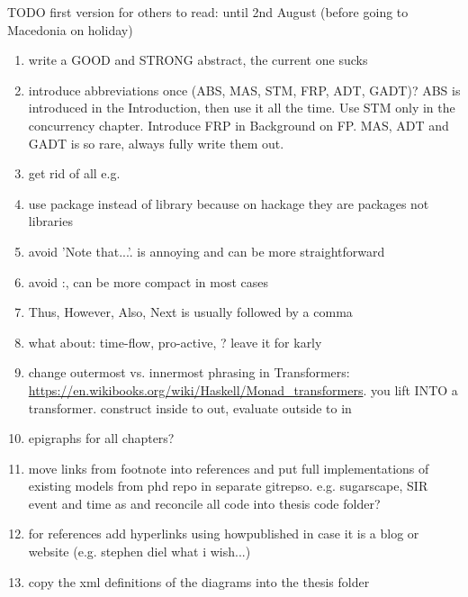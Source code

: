 \documentclass[oneside]{book}
\begin{document}
TODO first version for others to read: until 2nd August (before going to Macedonia on holiday)
\begin{enumerate}
	\item write a GOOD and STRONG abstract, the current one sucks
	
	\item introduce abbreviations once (ABS, MAS, STM, FRP, ADT, GADT)? ABS is introduced in the Introduction, then use it all the time. Use STM only in the concurrency chapter. Introduce FRP in Background on FP. MAS, ADT and GADT is so rare, always fully write them out.
	
	\item get rid of all e.g.

	\item use package instead of library because on hackage they are packages not libraries 

	\item avoid 'Note that...'. is annoying and can be more straightforward

	\item avoid :, can be more compact in most cases	
	
	\item Thus, However, Also, Next is usually followed by a comma	
	
	\item what about: time-flow, pro-active, ? leave it for karly
	
	\item change outermost vs. innermost phrasing in Transformers: \url{https://en.wikibooks.org/wiki/Haskell/Monad_transformers}. you lift INTO a transformer. construct inside to out, evaluate outside to in
	
	\item epigraphs for all chapters?

	
	\item move links from footnote into references and put full implementations of existing models from phd repo in separate gitrepso. e.g. sugarscape, SIR event and time as and reconcile all code into thesis code folder?

	\item for references add hyperlinks using howpublished in case it is a blog or website (e.g. stephen diel what i wish...)	
		
	\item copy the xml definitions of the diagrams into the thesis folder


\end{enumerate}
\end{document}
